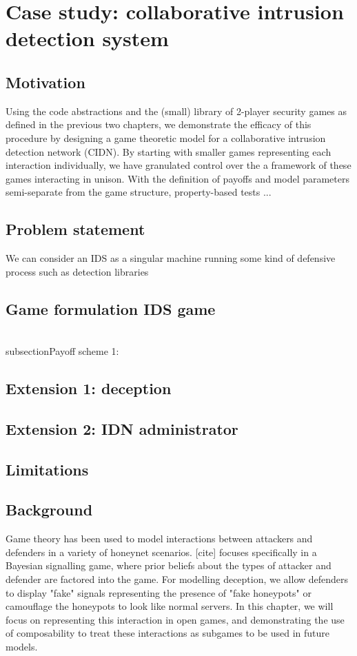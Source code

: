 \section{Case study: collaborative intrusion detection system}
\label{sec:4}
    \subsection{Motivation}
    Using the code abstractions and the (small) library of 2-player security games as defined in the previous two chapters, we demonstrate the efficacy of this procedure by designing a game theoretic model for a collaborative intrusion detection network (CIDN). By starting with smaller games representing each interaction individually, we have granulated control over the a framework of these games interacting in unison. With the definition of payoffs and model parameters semi-separate from the game structure, property-based tests ... 
    
    \subsection{Problem statement}
    We can consider an IDS as a singular machine running some kind of defensive process such as detection libraries
    \subsection{Game formulation IDS game}
    \\subsection{Payoff scheme 1: }
    \subsection{Extension 1: deception}
  
  	\subsection{Extension 2: IDN administrator}
  	\subsection{Limitations}
    \subsection{Background}
Game theory has been used to model interactions between attackers and defenders in a variety of honeynet scenarios. [cite] focuses specifically in a Bayesian signalling game, where prior beliefs about the types of attacker and defender are factored into the game. For modelling deception, we allow defenders to display "fake" signals representing the presence of "fake honeypots" or camouflage the honeypots to look like normal servers. In this chapter, we will focus on representing this interaction in open games, and demonstrating the use of composability to treat these interactions as subgames to be used in future models.  


